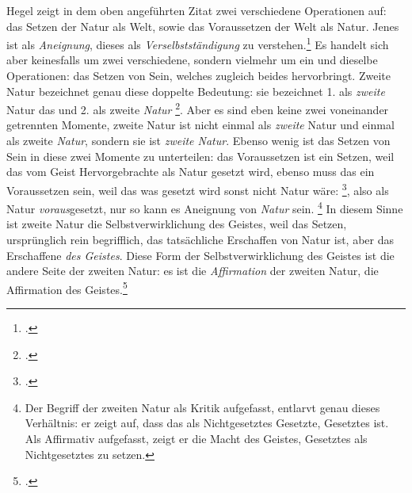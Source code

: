 \documentclass[12pt, a4paper, openany]{report}
\begin{document}
Hegel zeigt in dem oben angeführten Zitat zwei verschiedene Operationen auf: 
das Setzen der Natur als Welt, sowie das Voraussetzen der Welt als Natur.
Jenes ist als \emph{Aneignung}, dieses als \emph{Verselbstständigung} zu verstehen.\footcite[Vgl][141]{menke_autonomie_2018}
Es handelt sich aber keinesfalls um zwei verschiedene, sondern vielmehr um ein und dieselbe Operationen: 
das Setzen von Sein, welches zugleich beides hervorbringt.
Zweite Natur bezeichnet genau diese doppelte Bedeutung: 
sie bezeichnet 1. als \emph{zweite} Natur das  und 2. als zweite \emph{Natur} \footcite[][142]{menke_autonomie_2018}.
Aber es sind eben keine zwei voneinander getrennten Momente, zweite Natur ist nicht einmal als \emph{zweite} Natur und einmal als zweite \emph{Natur}, sondern sie ist \emph{zweite Natur}.
Ebenso wenig ist das Setzen von Sein in diese zwei Momente zu unterteilen:
das Voraussetzen ist ein Setzen, weil das vom Geist Hervorgebrachte als Natur gesetzt wird,
ebenso muss das  ein Voraussetzen sein, weil das was gesetzt wird sonst nicht Natur wäre: 
\footcite[][142]{menke_autonomie_2018}, also als Natur \emph{voraus}gesetzt, nur so kann es Aneignung von \emph{Natur} sein.%
\footnote{
    Der Begriff der zweiten Natur als Kritik aufgefasst, entlarvt genau dieses Verhältnis: er zeigt auf, dass das als Nichtgesetztes Gesetzte, Gesetztes ist.
    Als Affirmativ aufgefasst, zeigt er die Macht des Geistes, Gesetztes als Nichtgesetztes zu setzen.
}
In diesem Sinne ist zweite Natur die Selbstverwirklichung des Geistes, weil das Setzen, ursprünglich rein begrifflich, das tatsächliche Erschaffen von Natur ist, aber das Erschaffene \emph{des Geistes}.
Diese Form der Selbstverwirklichung des Geistes ist die andere Seite der zweiten Natur: es ist die \emph{Affirmation} der zweiten Natur, die Affirmation des Geistes.\footcite[Vgl.][143]{menke_autonomie_2018}\\
\end{document}
